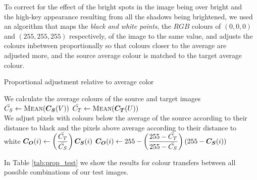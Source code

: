 To correct for the effect of the bright spots in the image being over bright and the high-key appearance resulting from all the shadows being brightened, we used an algorithm that maps the \textit{black and white points}, the $RGB$ colours of $(0, 0, 0)$ and $(255, 255, 255)$ respectively, of the image to the same value, and adjusts the colours inbetween proportionally so that colours closer to the average are adjusted more, and the source average colour is matched to the target average colour.

\begin{algorithm}[H]
\caption{Proportional adjustment relative to average color}
\label{eq:prop_algo}
\begin{algorithmic}
\State We calculate the average colours of the source and target images
\State $\mean{C_S} \gets \Call{Mean}{\vect{C_S}(V)}$
\State $\mean{C_T} \gets \Call{Mean}{\vect{C_T}(U)}$\\

\State We adjust pixels with colours below the average of the source according to their distance to black and the pixels above average according to their distance to white
\State $\boldsymbol{C_O}(i) \gets \displaystyle \left(\frac{\bar{C_T}}{\bar{C_S}}\right)\boldsymbol{C_S}(i)$
\Else
\State $\boldsymbol{C_O}(i) \gets \displaystyle 255 - \left(\frac{255 - \bar{C_T}}{255 - \bar{C_S}}\right)(255 - \boldsymbol{C_S}(i))$
\EndIf
\EndFor
\end{algorithmic}
\end{algorithm}

In Table \ref{tab:prop_test} we show the results for colour transfers between all possible combinations of our test images.


